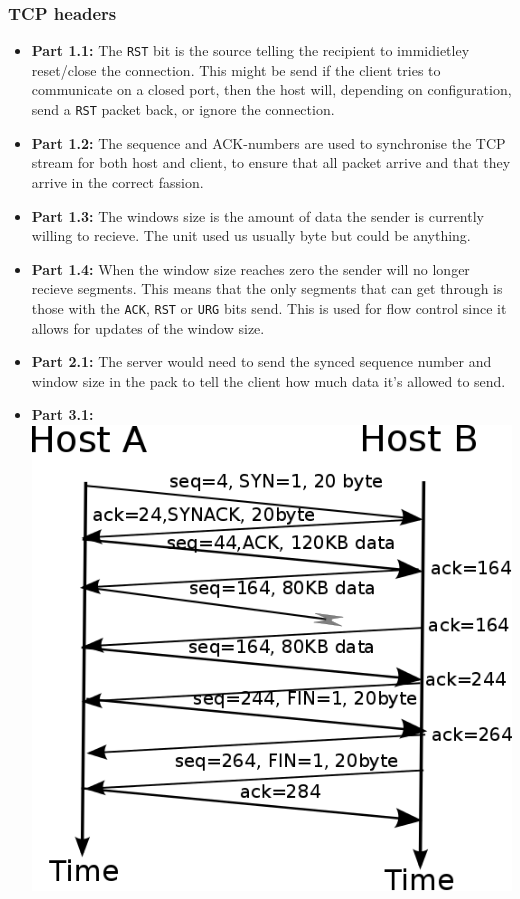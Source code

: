 \documentclass[10pt]{article}
\begin{document}
\subsubsection{TCP headers}
\begin{itemize}
  \item \textbf{Part 1.1:} The \texttt{RST} bit is the source telling the
        recipient to immidietley reset/close the connection. This might be send
        if the client tries to communicate on a closed port, then the host will,
        depending on configuration, send a \texttt{RST} packet back, or ignore
        the connection.
  \item \textbf{Part 1.2:} The sequence and ACK-numbers are used to synchronise
        the TCP stream for both host and client, to ensure that all packet
        arrive and that they arrive in the correct fassion.
  \item \textbf{Part 1.3:} The windows size is the amount of data the sender is
        currently willing to recieve. The unit used us usually byte but could be
        anything.
  \item \textbf{Part 1.4:} When the window size reaches zero the sender will no
        longer recieve segments. This means that the only segments that can get
        through is those with the \texttt{ACK}, \texttt{RST} or \texttt{URG}
        bits send. This is used for flow control since it allows for updates of
        the window size.
  \item \textbf{Part 2.1:} The server would need to send the synced sequence
        number and window size in the pack to tell the client how much data
        it's allowed to send.
  \item \textbf{Part 3.1:}\\
        \includegraphics[width=\textwidth]{transmission.png}
\end{itemize}
\end{document}
